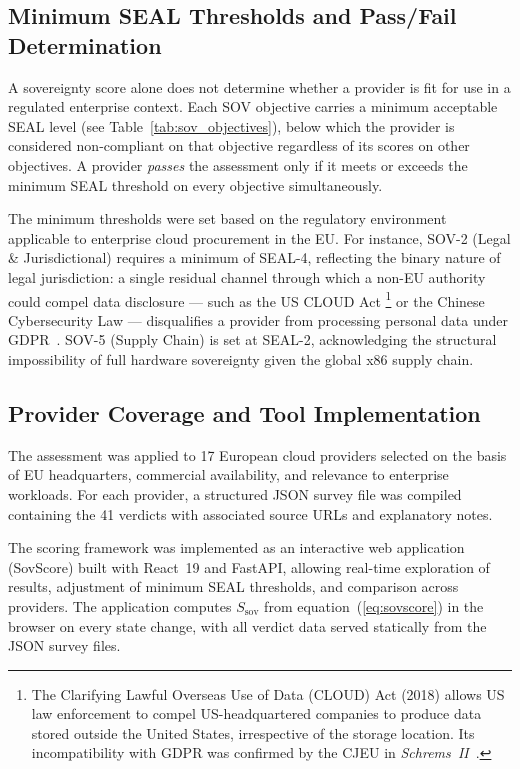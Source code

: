\subsection{Minimum SEAL Thresholds and Pass/Fail Determination}
\label{subsec:min_seal}

A sovereignty score alone does not determine whether a provider is fit for use in a regulated enterprise context. Each SOV objective carries a minimum acceptable SEAL level (see Table~\ref{tab:sov_objectives}), below which the provider is considered non-compliant on that objective regardless of its scores on other objectives. A provider \textit{passes} the assessment only if it meets or exceeds the minimum SEAL threshold on every objective simultaneously.

The minimum thresholds were set based on the regulatory environment applicable to enterprise cloud procurement in the EU. For instance, SOV-2 (Legal \& Jurisdictional) requires a minimum of SEAL-4, reflecting the binary nature of legal jurisdiction: a single residual channel through which a non-EU authority could compel data disclosure — such as the US CLOUD Act%
\footnote{The Clarifying Lawful Overseas Use of Data (CLOUD) Act (2018) allows US law enforcement to compel US-headquartered companies to produce data stored outside the United States, irrespective of the storage location. Its incompatibility with GDPR was confirmed by the CJEU in \textit{Schrems~II}~\cite{SchremsII_2020}.}
or the Chinese Cybersecurity Law — disqualifies a provider from processing personal data under GDPR~\cite{GDPR2016}. SOV-5 (Supply Chain) is set at SEAL-2, acknowledging the structural impossibility of full hardware sovereignty given the global x86 supply chain.

\subsection{Provider Coverage and Tool Implementation}
\label{subsec:sovscore_implementation}

The assessment was applied to 17 European cloud providers selected on the basis of EU headquarters, commercial availability, and relevance to enterprise workloads. For each provider, a structured JSON survey file was compiled containing the 41 verdicts with associated source URLs and explanatory notes.

The scoring framework was implemented as an interactive web application (SovScore) built with React~19 and FastAPI, allowing real-time exploration of results, adjustment of minimum SEAL thresholds, and comparison across providers. The application computes $S_{\text{sov}}$ from equation~(\ref{eq:sovscore}) in the browser on every state change, with all verdict data served statically from the JSON survey files.

